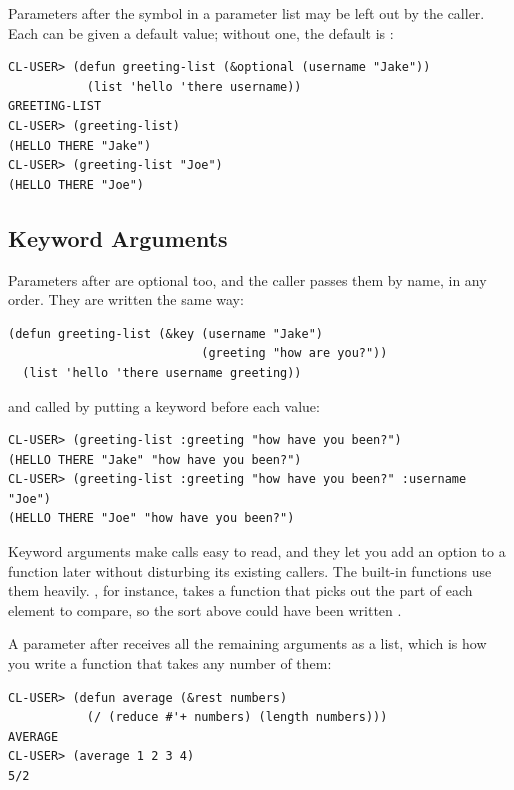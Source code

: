 Parameters after the symbol  in a parameter list
may be left out by the caller. Each can be given a default value;
without one, the default is :

\begin{verbatim}
CL-USER> (defun greeting-list (&optional (username "Jake"))
           (list 'hello 'there username))
GREETING-LIST
CL-USER> (greeting-list)
(HELLO THERE "Jake")
CL-USER> (greeting-list "Joe")
(HELLO THERE "Joe")
\end{verbatim}

\subsection{Keyword Arguments}

Parameters after  are optional too, and the caller passes
them by name, in any order. They are written the same way:

\begin{verbatim}
(defun greeting-list (&key (username "Jake")
                           (greeting "how are you?"))
  (list 'hello 'there username greeting))
\end{verbatim}

\noindent
and called by putting a keyword before each value:

\begin{verbatim}
CL-USER> (greeting-list :greeting "how have you been?")
(HELLO THERE "Jake" "how have you been?")
CL-USER> (greeting-list :greeting "how have you been?" :username "Joe")
(HELLO THERE "Joe" "how have you been?")
\end{verbatim}

Keyword arguments make calls easy to read, and they let you add an
option to a function later without disturbing its existing callers.
The built-in functions use them heavily. , for instance,
takes a  function that picks out the part of each element
to compare, so the sort above could have been written
.

A parameter after  receives all the remaining arguments
as a list, which is how you write a function that takes any number of
them:

\begin{verbatim}
CL-USER> (defun average (&rest numbers)
           (/ (reduce #'+ numbers) (length numbers)))
AVERAGE
CL-USER> (average 1 2 3 4)
5/2
\end{verbatim}

